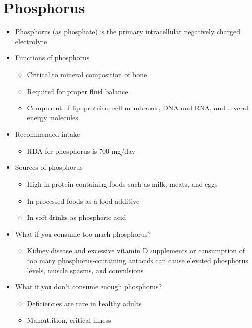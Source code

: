 \documentclass[title={Chapter 9}]{fdsn201notes}
\begin{document}
\section{Phosphorus}\label{sec:Phosphorus}
\begin{itemize}
	\item Phosphorus (as phosphate) is the primary intracellular negatively charged electrolyte
	\item Functions of phosphorus
	\begin{itemize}
		\item Critical to mineral composition of bone
		\item Required for proper fluid balance
		\item Component of lipoproteins, cell membranes, DNA and RNA, and several energy molecules
	\end{itemize}
	\item Recommended intake
	\begin{itemize}
		\item RDA for phosphorus is 700 mg/day
	\end{itemize}
	\item Sources of phosphorus
	\begin{itemize}
		\item High in protein-containing foods such as milk, meats, and eggs
		\item In processed foods as a food additive
		\item In soft drinks as phosphoric acid
	\end{itemize}
	\item What if you consume too much phosphorus?
	\begin{itemize}
		\item Kidney disease and excessive vitamin D supplements or consumption of too many phosphorus-containing antacids can cause elevated phosphorus levels, muscle spasms, and convulsions
	\end{itemize}
	\item What if you don’t consume enough phosphorus?
	\begin{itemize}
		\item Deficiencies are rare in healthy adults
		\item Malnutrition, critical illness
	\end{itemize}
\end{itemize}
\end{document}
